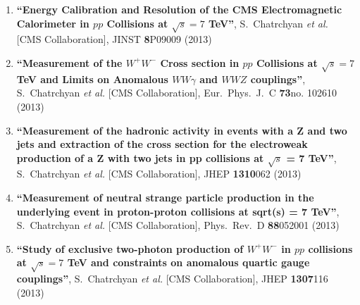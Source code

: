 \begin{enumerate}
\item%
{\bf ``Energy Calibration and Resolution of the CMS Electromagnetic Calorimeter in $pp$ Collisions at $\sqrt{s} = 7$ TeV''}, 
  S.~Chatrchyan {\it et al.}  [CMS Collaboration], 
JINST {\bf 8}P09009 (2013) %


\item%
{\bf ``Measurement of the $W^+W^-$ Cross section in $pp$ Collisions at $\sqrt{s} = 7$ TeV and Limits on Anomalous $WW\gamma$ and $WWZ$ couplings''}, 
  S.~Chatrchyan {\it et al.}  [CMS Collaboration], 
Eur.\ Phys.\ J.\ C {\bf 73}no. 102610 (2013) %


\item%
{\bf ``Measurement of the hadronic activity in events with a Z and two jets and extraction of the cross section for the electroweak production of a Z with two jets in pp collisions at $\sqrt{s}$ = 7 TeV''}, 
  S.~Chatrchyan {\it et al.}  [CMS Collaboration], 
JHEP {\bf 1310}062 (2013) %


\item%
{\bf ``Measurement of neutral strange particle production in the underlying event in proton-proton collisions at sqrt(s) = 7 TeV''}, 
  S.~Chatrchyan {\it et al.}  [CMS Collaboration], 
Phys.\ Rev.\ D {\bf 88}052001 (2013) %


\item%
{\bf ``Study of exclusive two-photon production of $W^+W^-$ in $pp$ collisions at $\sqrt{s} = 7$ TeV and constraints on anomalous quartic gauge couplings''}, 
  S.~Chatrchyan {\it et al.}  [CMS Collaboration], 
JHEP {\bf 1307}116 (2013) %



\end{enumerate}
